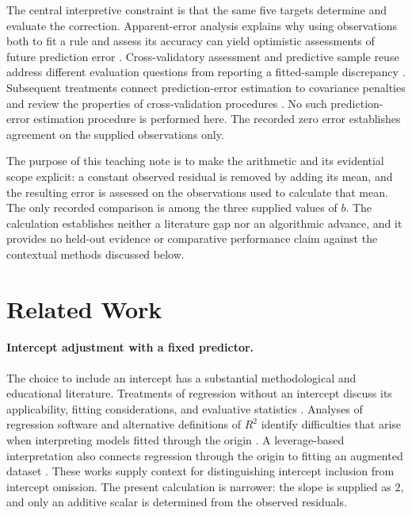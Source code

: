 \documentclass[11pt]{article}
\begin{document}
The central interpretive constraint is that the same five targets determine and evaluate the correction. Apparent-error analysis explains why using observations both to fit a rule and assess its accuracy can yield optimistic assessments of future prediction error \cite{Efron1986HowBiased}. Cross-validatory assessment and predictive sample reuse address different evaluation questions from reporting a fitted-sample discrepancy \cite{Stone1974CrossvalidatoryChoice,Geisser1975PredictiveSample}. Subsequent treatments connect prediction-error estimation to covariance penalties and review the properties of cross-validation procedures \cite{Efron2004EstimationPrediction,Arlot2010SurveyCrossvalidation}. No such prediction-error estimation procedure is performed here. The recorded zero error establishes agreement on the supplied observations only.

The purpose of this teaching note is to make the arithmetic and its evidential scope explicit: a constant observed residual is removed by adding its mean, and the resulting error is assessed on the observations used to calculate that mean. The only recorded comparison is among the three supplied values of $b$. The calculation establishes neither a literature gap nor an algorithmic advance, and it provides no held-out evidence or comparative performance claim against the contextual methods discussed below.

\section{Related Work}

\paragraph{Intercept adjustment with a fixed predictor.}
The choice to include an intercept has a substantial methodological and educational literature. Treatments of regression without an intercept discuss its applicability, fitting considerations, and evaluative statistics \cite{Hahn1977FittingRegression,Hawkins1980NoteFitting,Eisenhauer2003RegressionThrough}. Analyses of regression software and alternative definitions of $R^2$ identify difficulties that arise when interpreting models fitted through the origin \cite{Gordon1981ErrorsComputer,Kvlseth1985CautionaryNote}. A leverage-based interpretation also connects regression through the origin to fitting an augmented dataset \cite{Casella1983LeverageRegression}. These works supply context for distinguishing intercept inclusion from intercept omission. The present calculation is narrower: the slope is supplied as $2$, and only an additive scalar is determined from the observed residuals.
\end{document}

